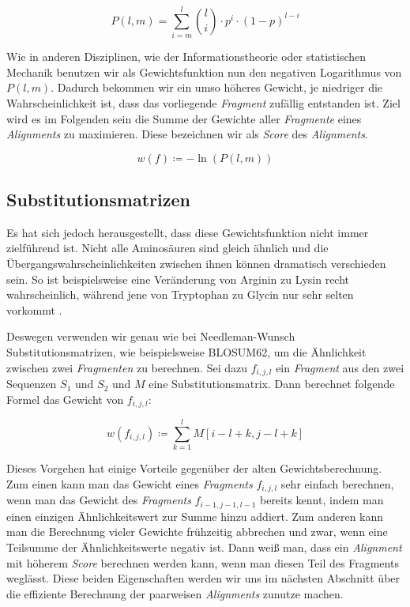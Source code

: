 \begin{equation}
	P(l,m) = \sum_{i=m}^{l} {l \choose i} \cdot p^i \cdot (1-p)^{l-i}
\end{equation}

Wie in anderen Disziplinen, wie der Informationstheorie oder statistischen Mechanik benutzen wir als Gewichtsfunktion nun den negativen Logarithmus von $P(l,m)$. Dadurch bekommen wir ein umso höheres Gewicht, je niedriger die Wahrscheinlichkeit ist, dass das vorliegende \emph{Fragment} zufällig entstanden ist. Ziel wird es im Folgenden sein die Summe der Gewichte aller \emph{Fragmente} eines \emph{Alignments} zu maximieren. Diese bezeichnen wir als \emph{Score} des \emph{Alignments}.

\begin{equation}
	w(f) \coloneqq -\ln(P(l,m))	
\end{equation}

\subsection{Substitutionsmatrizen}\label{subsec:subs_matr}

Es hat sich jedoch herausgestellt, dass diese Gewichtsfunktion nicht immer zielführend ist. Nicht alle Aminosäuren sind gleich ähnlich und die Übergangswahrscheinlichkeiten zwischen ihnen können dramatisch verschieden sein. So ist beispielsweise eine Veränderung von Arginin zu Lysin recht wahrscheinlich, während jene von Tryptophan zu Glycin nur sehr selten vorkommt \citep{p13}. 

Deswegen verwenden wir genau wie bei Needleman-Wunsch Substitutionsmatrizen, wie beispielsweise BLOSUM62, um die Ähnlichkeit zwischen zwei \emph{Fragmenten} zu berechnen. Sei dazu $f_{i,j,l}$ ein \emph{Fragment} aus den zwei Sequenzen $S_1$ und $S_2$ und $M$ eine Substitutionsmatrix. Dann berechnet folgende Formel das Gewicht von $f_{i,j,l}$:

\begin{equation}
	w(f_{i,j,l}) \coloneqq \sum_{k=1}^{l} M[i\!-\!l\!+\!k,j\!-\!l\!+\!k]
\end{equation}

Dieses Vorgehen hat einige Vorteile gegenüber der alten Gewichtsberechnung. Zum einen kann man das Gewicht eines \emph{Fragments} $f_{i,j,l}$ sehr einfach berechnen, wenn man das Gewicht des \emph{Fragments} $f_{i-1,j-1,l-1}$ bereits kennt, indem man einen einzigen Ähnlichkeitswert zur Summe hinzu addiert. Zum anderen kann man die Berechnung vieler Gewichte frühzeitig abbrechen und zwar, wenn eine Teilsumme der Ähnlichkeitswerte negativ ist. Dann weiß man, dass ein \emph{Alignment} mit höherem \emph{Score} berechnen werden kann, wenn man diesen Teil des Fragments weglässt. Diese beiden Eigenschaften werden wir uns im nächsten Abschnitt über die effiziente Berechnung der paarweisen \emph{Alignments} zunutze machen.

